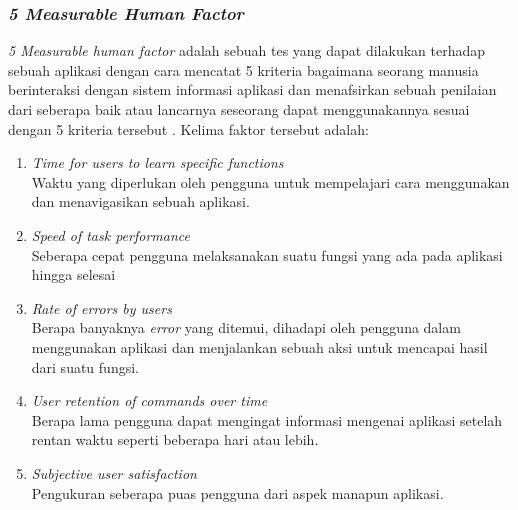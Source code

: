 \documentclass[a4paper]{article}
\newcommand{\subsubbab}[1]{%
    \subsubsection{#1}%
}
\begin{document}
\subsubbab{\textit{5 Measurable Human Factor}}
\textit{5 Measurable human factor} adalah sebuah tes yang dapat dilakukan terhadap sebuah aplikasi dengan cara mencatat 5 kriteria bagaimana seorang manusia berinteraksi dengan sistem informasi aplikasi dan menafsirkan sebuah penilaian dari seberapa baik atau lancarnya seseorang dapat menggunakannya sesuai dengan 5 kriteria tersebut \autocite{Shneiderman_Plaisant_Cohen_Jacobs_Elmqvist_2018_5_factors}. Kelima faktor tersebut adalah:
\begin{enumerate}
    \item \textit{Time for users to learn specific functions}\\
    Waktu yang diperlukan oleh pengguna untuk mempelajari cara menggunakan dan menavigasikan sebuah aplikasi.
    \item \textit{Speed of task performance}\\
    Seberapa cepat pengguna melaksanakan suatu fungsi yang ada pada aplikasi hingga selesai
    \item \textit{Rate of errors by users}\\
    Berapa banyaknya \textit{error} yang ditemui, dihadapi oleh pengguna dalam menggunakan aplikasi dan menjalankan sebuah aksi untuk mencapai hasil dari suatu fungsi.
    \item \textit{User retention of commands over time}\\
    Berapa lama pengguna dapat mengingat informasi mengenai aplikasi setelah rentan waktu seperti beberapa hari atau lebih.
    \item \textit{Subjective user satisfaction}\\
    Pengukuran seberapa puas pengguna dari aspek manapun aplikasi.
\end{enumerate}
\end{document}
